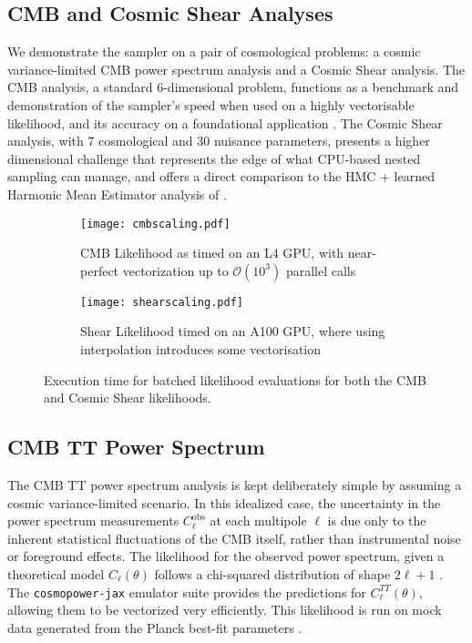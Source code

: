 \documentclass[twocolumn]{openjournal}
\begin{document}
\subsection*{CMB and Cosmic Shear Analyses}
We demonstrate the sampler on a pair of cosmological problems: a cosmic variance-limited CMB power spectrum analysis and a Cosmic Shear analysis. The CMB analysis, a standard 6-dimensional problem, functions as a benchmark and demonstration of the sampler's speed when used on a highly vectorisable likelihood, and its accuracy on a foundational application \citep{planck}. The Cosmic Shear analysis, with 7 cosmological and 30 nuisance parameters, presents a higher dimensional challenge that represents the edge of what CPU-based nested sampling can manage, and offers a direct comparison to the HMC + learned Harmonic Mean Estimator analysis of \cite{Piras_2024}.
\begin{figure*}[ht]
    \centering %
    \begin{subfigure}[b]{0.48\textwidth}
        \centering
        \texttt{[image: cmbscaling.pdf]}
        \caption{CMB Likelihood as timed on an L4 GPU, with near-perfect vectorization up to $\mathcal{O}(10^3)$ parallel calls}
        \label{fig:cmb_scaling}
    \end{subfigure}
    \hfill %
    \begin{subfigure}[b]{0.48\textwidth}
        \centering
        \texttt{[image: shearscaling.pdf]} 
        \caption{Shear Likelihood timed on an A100 GPU, where using interpolation introduces some vectorisation}
        \label{fig:shear_scaling}
    \end{subfigure}
    \caption{Execution time for batched likelihood evaluations for both the CMB and Cosmic Shear likelihoods.}
    \label{fig:likelihood_scaling}
\end{figure*}
\subsection{CMB TT Power Spectrum}
The CMB TT power spectrum analysis is kept deliberately simple by assuming a cosmic variance-limited scenario. In this idealized case, the uncertainty in the power spectrum measurements $C_\ell^{\text{obs}}$ at each multipole $\ell$ is due only to the inherent statistical fluctuations of the CMB itself, rather than instrumental noise or foreground effects. The likelihood for the observed power spectrum, given a theoretical model $C_\ell(\theta)$ follows a chi-squared distribution of shape $2\ell +1$ \citep{planck}. The \texttt{cosmopower-jax} emulator suite provides the predictions for $C^{TT}_\ell(\theta)$, allowing them to be vectorized very efficiently. This likelihood is run on mock data generated from the Planck best-fit parameters \citep{planck}.
\end{document}

